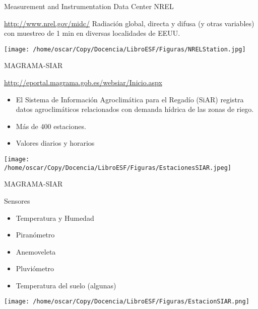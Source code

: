 \documentclass[xcolor={usenames,svgnames,dvipsnames}]{beamer}
\begin{document}
\begin{frame}[label=sec-4-3]{Measurement and Instrumentation Data Center NREL}
\begin{block}{\url{http://www.nrel.gov/midc/}}
Radiación global, directa y difusa (y otras variables) con muestreo de
  1 min en diversas localidades de EEUU.

\begin{center}
\texttt{[image: /home/oscar/Copy/Docencia/LibroESF/Figuras/NRELStation.jpg]}
\end{center}
\end{block}
\end{frame}
\begin{frame}[label=sec-4-4]{MAGRAMA-SIAR}
\begin{block}{\url{http://eportal.magrama.gob.es/websiar/Inicio.aspx}}
\begin{itemize}
\item El Sistema de Información Agroclimática para el Regadío (SiAR)
registra datos agroclimáticos relacionados con demanda hídrica de
las zonas de riego.

\item Más de 400 estaciones.

\item Valores diarios y horarios
\end{itemize}

\begin{center}
\texttt{[image: /home/oscar/Copy/Docencia/LibroESF/Figuras/EstacionesSIAR.jpeg]}
\end{center}
\end{block}
\end{frame}
\begin{frame}[label=sec-4-5]{MAGRAMA-SIAR}
\begin{block}{Sensores}
\begin{itemize}
\item Temperatura y Humedad
\item Piranómetro
\item Anemoveleta
\item Pluviómetro
\item Temperatura del suelo  (algunas)
\end{itemize}

\begin{center}
\texttt{[image: /home/oscar/Copy/Docencia/LibroESF/Figuras/EstacionSIAR.png]}
\end{center}
\end{block}
\end{frame}
\end{document}
